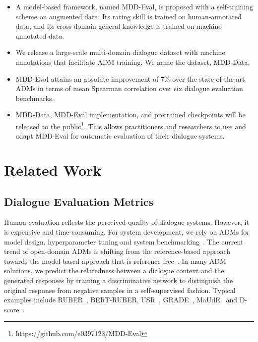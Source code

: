 \documentclass[letterpaper]{article} \usepackage{aaai22}  \usepackage{times}  \usepackage{helvet}  \usepackage{courier}  \usepackage[hyphens]{url}  \usepackage{graphicx} \urlstyle{rm} \def\UrlFont{\rm}  \usepackage{natbib}  \usepackage{caption} \DeclareCaptionStyle{ruled}{labelfont=normalfont,labelsep=colon,strut=off} \frenchspacing  \setlength{\pdfpagewidth}{8.5in}  \setlength{\pdfpageheight}{11in}  \usepackage{algorithm}
\begin{document}
\begin{itemize}
    \item A model-based framework, named MDD-Eval, is proposed with a self-training scheme on augmented data. Its rating skill is trained on human-annotated data, and its cross-domain general knowledge is trained on machine-annotated data. 
    \item We release a large-scale multi-domain dialogue dataset with machine annotations that facilitate ADM training. We name the dataset, MDD-Data.  
    \item 
    MDD-Eval attains an absolute improvement of 7\% over the state-of-the-art ADMs in terms of mean Spearman correlation over six dialogue evaluation benchmarks.
    




\item MDD-Data, MDD-Eval implementation, and pretrained checkpoints will be released to the public\footnote{https://github.com/e0397123/MDD-Eval}. This allows practitioners and researchers to use and adapt MDD-Eval for automatic evaluation of their dialogue systems.  
\end{itemize}


\section{Related Work}
\subsection{Dialogue Evaluation Metrics}
Human evaluation reflects the perceived quality of dialogue systems. However, it is expensive and time-consuming. For system development, we rely on ADMs for model design, hyperparameter tuning and system benchmarking~\citep{yeh2021comprehensive}. The current trend of open-domain ADMs is shifting from the reference-based approach towards the model-based approach that is reference-free~\citep{mehri-eskenazi-2020-unsupervised,zhang-etal-2021-dynaeval}. In many ADM solutions, we predict the relatedness between a dialogue context and the generated responses by training a discriminative network to distinguish the original response from negative samples in a self-supervised fashion. Typical examples include RUBER~\citep{tao2018ruber}, BERT-RUBER\citep{ghazarian-etal-2019-better}, USR~\citep{mehri-eskenazi-2020-usr}, GRADE~\citep{huang-etal-2020-grade}, MaUdE~\citep{sinha-etal-2020-learning} and D-score~\citep{zhang-etal-2021-dscore}. 
\end{document}
